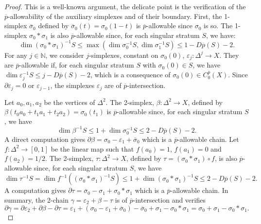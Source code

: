 \documentclass[10pt,a4paper]{amsart}
\def\N{\mathbb{N}}
\def\eps{\varepsilon}
\def\ov{\overline}
\begin{document}
\begin{proof}
This is a well-known argument, the  delicate point is the verification of the $\ov{p}$-allowability of the auxiliary simplexes and of their boundary.
First, the 1-simplex $\ov \sigma_0$ defined by $\ov \sigma_0(t) = \sigma_0(1-t)$ is $\ov p$-allowable since $\sigma_{0}$ is so.
The 1-simplex $\sigma_{0}*\sigma_{1}$ is also $\ov{p}$-allowable since,  for each singular stratum $S$, we have:
      $$
      \dim (\sigma_0*\sigma_1)^{-1}S \leq \max ( \dim \sigma_0^{-1}S, \dim  \sigma_1^{-1}S) \leq 1 - D\ov p(S) -2.
      $$
For any $j\in \N$, we consider $j$-simplexes, constant on $\sigma_{0}(0)$,  $\eps_j \colon \Delta^j \to X$.
They are $\ov p$-allowable if, for each singular stratum $S$ with $\sigma_0(0) \in S$,  we have
$ \dim \eps_j  ^{-1}S \leq j - D\ov p(S) -2$, which is a consequence of
% 
 $\sigma_0(0) \in C_0^{\ov p}(X)$. 
 Since $\partial \eps_j = 0$ or  $\eps_{j-1}$, the simplexes $\eps_j$ are of $\ov p$-intersection.

   
 Let $a_{0},a_{1},a_{2}$ be the vertices of $\Delta^2$. The 2-simplex, $\beta\colon \Delta^2\to X$, defined by
 $\beta(t_{0}a_{0}+t_{1}a_{1}+t_{2}a_{2})=\sigma_{0}(t_{1})$ is $\ov{p}$-allowable since,
% 
for each singular stratum $S$, we have
$$
\dim \beta^{-1}S \leq 1+\dim \sigma_0^{-1} S
\leq
2 - D\ov p(S) -2 .
$$
A direct computation gives
$\partial \beta =  \sigma_0  - \eps_1 + \ov \sigma_0$  which is a $\ov p$-allowable chain. 
%
Let $f\colon \Delta^2\to [0,1]$ be the linear map such that $f(a_{0})=1$, $f(a_{1})=0$ and $f(a_{2})=1/2$.
The 2-simplex, $\tau\colon \Delta^2\to X$, defined by $\tau=(\sigma_{0}\ast\sigma_{1})\circ f$, is also $\ov{p}$-allowable since,
%
for each singular stratum $S$, we have
$$
\dim \tau^{-1}S =\dim f^{-1}\left( (\sigma_0*\sigma_1)^{-1} S\right) \leq 1+ \dim (\sigma_0*\sigma_1)^{-1} S \leq 2 - D\ov p(S) -2.
$$
%
A computation gives $\partial \tau = \ov \sigma_0  -  \sigma_1 +  \sigma_0 * \sigma_1$
which is a $\ov{p}$-allowable chain.
%
In summary, the  2-chain $\gamma =  \eps_2 + \beta - \tau $ is of $\ov p$-intersection and verifies
%
$$\partial \gamma =\partial \eps_2 + \partial \beta -  \partial \tau = \eps_1 +(   \sigma_0  - \eps_1 + \ov \sigma_0) 
-  \ov \sigma_0  +  \sigma_1 - \sigma_0 * \sigma_1 =  
  \sigma_0
  + \sigma_1 -  \sigma_0 * \sigma_1.$$
%
\end{proof}
\end{document}

